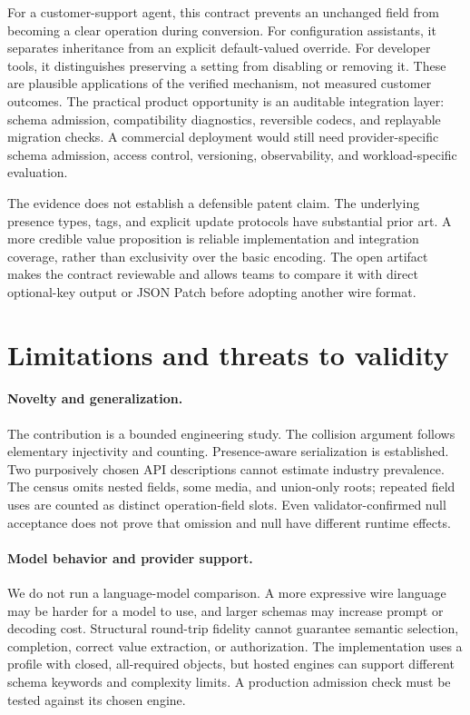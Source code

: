 \documentclass[10pt,twocolumn]{article}
\begin{document}
For a customer-support agent, this contract prevents an unchanged field from becoming a clear operation during conversion. For configuration assistants, it separates inheritance from an explicit default-valued override. For developer tools, it distinguishes preserving a setting from disabling or removing it. These are plausible applications of the verified mechanism, not measured customer outcomes. The practical product opportunity is an auditable integration layer: schema admission, compatibility diagnostics, reversible codecs, and replayable migration checks. A commercial deployment would still need provider-specific schema admission, access control, versioning, observability, and workload-specific evaluation.

The evidence does not establish a defensible patent claim. The underlying presence types, tags, and explicit update protocols have substantial prior art. A more credible value proposition is reliable implementation and integration coverage, rather than exclusivity over the basic encoding. The open artifact makes the contract reviewable and allows teams to compare it with direct optional-key output or JSON Patch before adopting another wire format.

\section{Limitations and threats to validity}
\paragraph{Novelty and generalization.}
The contribution is a bounded engineering study. The collision argument follows elementary injectivity and counting. Presence-aware serialization is established. Two purposively chosen API descriptions cannot estimate industry prevalence. The census omits nested fields, some media, and union-only roots; repeated field uses are counted as distinct operation-field slots. Even validator-confirmed null acceptance does not prove that omission and null have different runtime effects.

\paragraph{Model behavior and provider support.}
We do not run a language-model comparison. A more expressive wire language may be harder for a model to use, and larger schemas may increase prompt or decoding cost. Structural round-trip fidelity cannot guarantee semantic selection, completion, correct value extraction, or authorization. The implementation uses a profile with closed, all-required objects, but hosted engines can support different schema keywords and complexity limits. A production admission check must be tested against its chosen engine.
\end{document}
